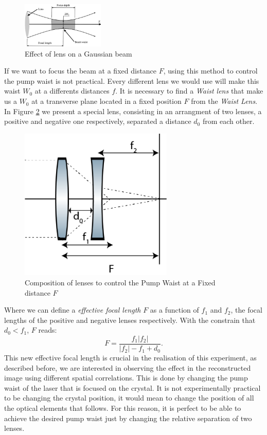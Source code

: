 \begin{figure}[h!]
\centering
\includegraphics[width=0.35\textwidth]{Figures/waist.png}
\caption{Effect of lens on a Gaussian beam} 
\label{fig:waist}
\end{figure}

If we want to focus the beam at a fixed distance $F$, using this method to control the pump waist is not practical. 
Every different lens we would use will make this waist $W_0$ at a differents distances $f$. It is necessary to find a \textit{Waist lens}
that make us a $W_0$ at a transverse plane located in a fixed position $F$ from the \textit{Waist Lens}. 
In Figure \ref{fig:fixed} we present a special lens, consisting in an arrangment of two lenses, a positive 
and negative one respectively, separated a distance $d_0$ from each other.
\begin{figure}[h!]
\centering
 \includegraphics[width=0.65\textwidth]{Figures/fixed.png}
\caption{Composition of lenses to control the Pump Waist at a Fixed distance $F$} 
\label{fig:fixed}
\end{figure}
Where we can define a \textit{effective focal length} $F$ as a function of  $f_1$ and $f_2$, the focal lengths of the positive and negative lenses 
respectively. With the constrain that $d_0 < f_1$, $F$ reads:
\begin{equation}
F=\frac{f_1 |f_2|}{|f_2|-f_1+d_0}.
\end{equation}
This new effective focal length is crucial in the realisation of this experiment, as described before, we are interested in observing the effect 
in the reconstructed image using different spatial correlations. This is done by changing the pump waist of the laser that is focused on the crystal.
It is not experimentally practical to be changing the crystal position, it would mean to change the position of all the optical elements that 
follows. For this reason, it is perfect to be able to achieve the desired pump waist just by changing the relative separation of two lenses. 


